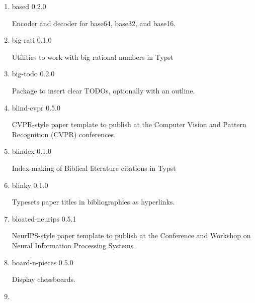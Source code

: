 \begin{enumerate}
  { basalt-backlinks } { 0.1.0 }

  Generate and get backlinks.
\item
  \href{/universe/package/based/}{}

  { based } { 0.2.0 }

  Encoder and decoder for base64, base32, and base16.
\item
  \href{/universe/package/big-rati/}{}

  { big-rati } { 0.1.0 }

  Utilities to work with big rational numbers in Typst
\item
  \href{/universe/package/big-todo/}{}

  { big-todo } { 0.2.0 }

  Package to insert clear TODOs, optionally with an outline.
\item
  \href{/universe/package/blind-cvpr/}{}


  { blind-cvpr } { 0.5.0 }

  CVPR-style paper template to publish at the Computer Vision and
  Pattern Recognition (CVPR) conferences.
\item
  \href{/universe/package/blindex/}{}

  { blindex } { 0.1.0 }

  Index-making of Biblical literature citations in Typst
\item
  \href{/universe/package/blinky/}{}

  { blinky } { 0.1.0 }

  Typesets paper titles in bibliographies as hyperlinks.
\item
  \href{/universe/package/bloated-neurips/}{}


  { bloated-neurips } { 0.5.1 }

  NeurIPS-style paper template to publish at the Conference and Workshop
  on Neural Information Processing Systems
\item
  \href{/universe/package/board-n-pieces/}{}

  { board-n-pieces } { 0.5.0 }

  Display chessboards.
\item
  \href{/universe/package/bob-draw/}{}


\end{enumerate}
